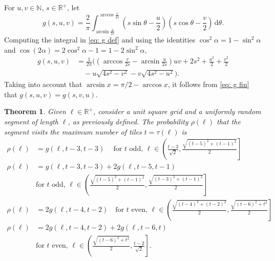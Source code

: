 \documentclass[12pt, a4paper]{article}
\newcommand{\diff}{\,\mathrm d}
\newcommand{\funt}{\tau} %
\newcommand{\probmax}{\rho} %
\newcommand{\len}{\ell} %
\newcommand{\tiles}{t} %
\newcommand{\genvar}{s}
\newtheorem{theorem}{Theorem}%
\begin{document}
For $u, v \in \mathbb N$, $\genvar \in \mathbb R^+$, let
\begin{equation}
\label{eq: g def}
g(\genvar, u, v) = \frac 2 \pi \int_{\arcsin \frac u {2\genvar}}^{\arccos \frac v {2\genvar}} \left( \genvar \sin \theta - \frac u 2 \right) \left( \genvar \cos \theta - \frac v 2 \right) \diff \theta.
\end{equation}
Computing the integral in \eqref{eq: g def} and using the identities $\cos^2 \alpha = 1-\sin^2 \alpha$ and $\cos(2\alpha) = 2\cos^2\alpha-1 = 1 - 2\sin^2\alpha$,
\begin{equation}
\label{eq: g fin}
\begin{split}
g(\genvar, u, v) &= \frac 1 {2\pi} \biggl(
\left(\arccos\frac{v}{2\genvar}-\arcsin\frac{u}{2\genvar}\right) u v + 2\genvar^2 + \frac{u^2} 2 + \frac{v^2} 2 \\
& \quad  - u \sqrt{4\genvar^2-v^2} - v \sqrt{4\genvar^2-u^2} \biggr).
\end{split}
\end{equation}
Taking into account that $\arcsin x = \pi/2 - \arccos x$, it follows from \eqref{eq: g fin} that $g(\genvar, u, v) = g(\genvar, v, u)$.

\begin{theorem}
\label{theo: probmax, sq}
Given $\len \in \mathbb R^+$, consider a unit square grid and a uniformly random segment of length $\len$, as previously defined. The probability $\probmax(\len)$ that the segment visits the maximum number of tiles $\tiles = \funt(\len)$ is
\begin{equation}
\label{eq: probmax}
\begin{split}
\probmax(\len) & = g\left(\len, 
\tiles-3, \tiles-3 \right) \quad\ \text{for } \tiles \text{ odd, } \textstyle \len \in \left( \frac{\tiles-3}{\sqrt{2}}, \frac{\sqrt{(\tiles-5)^2+(\tiles-1)^2}} 2 \right] \\
\probmax(\len) & = g\left(\len, \tiles-3, \tiles-3 \right) + 2 g\left(\len, \tiles-5, \tiles-1 \right) \\
& \text{for } \tiles \text{ odd, } \textstyle \len \in \left (\frac{\sqrt{(\tiles-5)^2+(\tiles-1)^2}} 2,  \frac{\sqrt{(\tiles-3)^2+(\tiles-1)^2}} 2 \right] \\
\probmax(\len) & = 2 g\left(\len, \tiles-4, \tiles-2 \right) \quad \text{for } \tiles \text{ even, } \textstyle \len \in \left( \frac{\sqrt{(\tiles-4)^2+(\tiles-2)^2}} 2, \frac{\sqrt{(\tiles-6)^2+\tiles^2}} 2 \right] \\
\probmax(\len) & = 2 g\left(\len, \tiles-4, \tiles-2 \right) + 2 g\left(\len, \tiles-6, \tiles \right) \\
& \text{for } \tiles \text{ even, } \textstyle \len \in \left( \frac{\sqrt{(\tiles-6)^2+\tiles^2}} 2, \frac{\tiles-2}{\sqrt{2}} \right].
\end{split}
\end{equation}
\end{theorem}
\end{document}
